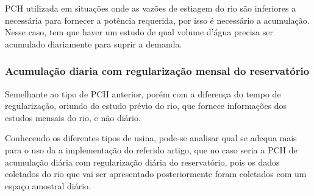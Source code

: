 PCH utilizada em situações onde as vazões de estiagem do rio são inferiores a necessária para fornecer a potência requerida, por isso é necessário a acumulação. Nesse caso, tem que haver um estudo de qual volume d’água precisa ser acumulado diariamente para suprir a demanda.

\subsubsection{Acumulação diaria com regularização mensal do reservatório }

Semelhante ao tipo de PCH anterior, porém com a diferença do tempo de regularização, oriundo do estudo prévio do rio, que fornece informações dos estudos mensais do rio, e não diário.

Conhecendo os diferentes tipos de usina, pode-se analisar qual se adequa mais para o uso da a implementação do referido artigo, que no caso seria a PCH de acumulação diária com regularização diária do reservatório, pois os dados coletados do rio que vai ser apresentado posteriormente foram coletados com um espaço amostral diário.
